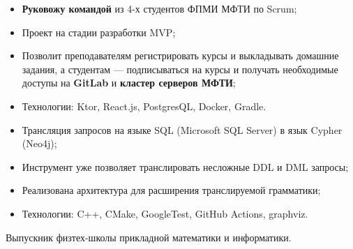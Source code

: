 \documentclass[10pt,a4paper,ragged2e,withhyper]{custom-altacv}
\begin{document}
\begin{paracol}{2}


\begin{itemize}
	\item \textbf{Руковожу командой} из 4-х студентов ФПМИ МФТИ по Scrum;
	\item Проект на стадии разработки MVP;
	\item Позволит преподавателям регистрировать курсы и выкладывать домашние задания, а студентам --- подписываться на курсы и получать необходимые доступы на \textbf{GitLab} и \textbf{кластер серверов МФТИ};
	\item Технологии: Ktor, React.js, PostgresQL, Docker, Gradle.
\end{itemize}

\divider


\begin{itemize}
	\item Трансляция запросов на языке SQL (Microsoft SQL Server) в язык Cypher (Neo4j);
	\item Инструмент уже позволяет транслировать несложные DDL и DML запросы;
	\item Реализована архитектура для расширения транслируемой грамматики;
	\item Технологии: C++, CMake, GoogleTest, GitHub Actions, graphviz.
\end{itemize}


\iffalse
\cvsection{Сертификаты и Дипломы}

\cvachievement{\faGraduationCap}{Участие в двух \textbf{международных} олимпиадах по астрономии}{IOAA и IAO}
\fi



\switchcolumn


Выпускник физтех-школы прикладной математики и информатики.




\end{paracol}
\end{document}
